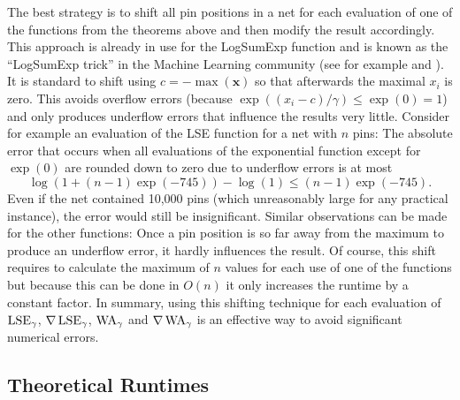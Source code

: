 The best strategy is to shift all pin positions in a net for each evaluation of one of the functions from the theorems above and 
then modify the result accordingly.
This approach is already in use for the LogSumExp function and is known as the \enquote{LogSumExp trick} in the Machine Learning community
(see for example \cite[p. 6]{DurkanPapamakariosMurray-SequentialNeuralMethods} and \cite[p. 3]{Cook-BasicPropertiesOfTheSoftMaximum}).
It is standard to shift using \(c = -\max(\mathbf{x})\) so that afterwards the maximal \(x_i\) is zero.
This avoids overflow errors (because \(\exp((x_i - c)/\gamma) \leq \exp(0) = 1\))
and only produces underflow errors that influence the results very little.
Consider for example an evaluation of the LSE function for a net with \(n\) pins:
The absolute error that occurs when all evaluations of the exponential function except for \(\exp(0)\) are rounded down to zero due to underflow errors is at most
\[ \log(1 + (n-1) \exp(-745)) - \log(1) \leq (n-1) \exp(-745). \]
Even if the net contained 10,000 pins (which unreasonably large for any practical instance),
the error would still be insignificant.
Similar observations can be made for the other functions: 
Once a pin position is so far away from the maximum to produce an underflow error, it hardly influences the result.
Of course, this shift requires to calculate the maximum of \(n\) values for each use of one of the functions 
but because this can be done in \(O(n)\) it only increases the runtime by a constant factor.
In summary, using this shifting technique for each evaluation of
\(\operatorname{LSE}_\gamma\), \(\nabla \operatorname{LSE}_\gamma\), \(\operatorname{WA}_\gamma\) and \(\nabla \operatorname{WA}_\gamma\)
is an effective way to avoid significant numerical errors.


\subsection{Theoretical Runtimes} \label{sec:theortical_runtimes}

